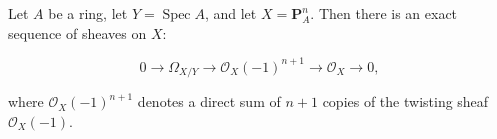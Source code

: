 Let $A$ be a ring, let $Y = \operatorname{Spec} A$, and let $X = \mathbf{P}_A^n$. Then there is an exact sequence of sheaves on $X$:

$$0 \to \Omega_{X/Y} \to \mathcal{O}_X(-1)^{n+1} \to \mathcal{O}_X \to 0,$$

where $\mathcal{O}_X(-1)^{n+1}$ denotes a direct sum of $n+1$ copies of the twisting sheaf $\mathcal{O}_X(-1)$.
